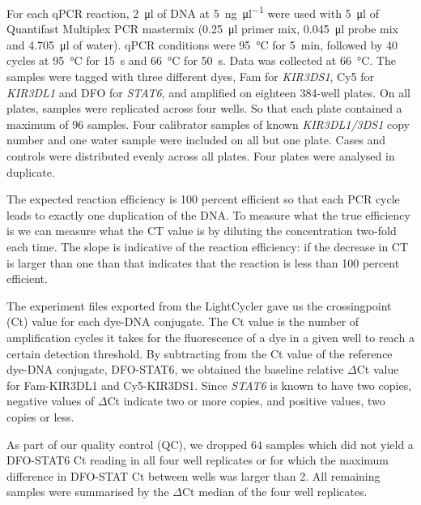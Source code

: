 For each qPCR reaction, \SI{2}{\micro\litre} of DNA at
\SI{5}{\nano\gram\per\micro\litre} were used with \SI{5}{\micro\litre} of
Quantifast Multiplex PCR mastermix (\SI{0.25}{\micro\litre} primer mix,
\SI{0.045}{\micro\litre} probe mix and \SI{4.705}{\micro\litre} of water).
qPCR conditions were \SI{95}{\degreeCelsius} for \SI{5}{\minute}, followed by 40
cycles at \SI{95}{\degreeCelsius} for \SI{15}{\second} and
\SI{66}{\degreeCelsius} for \SI{50}{\second}.  Data was collected at
\SI{66}{\degreeCelsius}.  The samples were tagged with three different dyes,
Fam for \emph{KIR3DS1}, Cy5 for \emph{KIR3DL1} and DFO for \emph{STAT6}, and
amplified on eighteen 384-well plates.  On all plates, samples were replicated
across four wells.  So that each plate contained a maximum of 96 samples.  Four
calibrator samples of known \emph{KIR3DL1/3DS1} copy number and one water
sample were included on all but one plate.  Cases and controls were distributed
evenly across all plates.  Four plates were analysed in duplicate.

The expected reaction efficiency is 100 percent efficient so that each PCR cycle leads to exactly one duplication of the DNA.
To measure what the true efficiency is we can measure what the CT value is by diluting the concentration two-fold each time.
The slope is indicative of the reaction efficiency: 
if the decrease in CT is larger than one than that indicates that the reaction is less than 100 percent efficient.





The experiment files exported from the LightCycler gave us the crossingpoint (Ct) value for each dye-DNA conjugate.
The Ct value is the number of amplification cycles it takes for the fluorescence of a dye in a given well to reach a certain detection threshold.
By subtracting from the Ct value of the reference dye-DNA conjugate, DFO-STAT6, we obtained the baseline relative $\Delta$Ct value for Fam-KIR3DL1 and Cy5-KIR3DS1.  
Since \emph{STAT6} is known to have two copies, negative values of $\Delta$Ct indicate two or more copies, and positive values, two copies or less.

As part of our quality control (QC), we dropped $64$ samples which did not yield a DFO-STAT6 Ct reading in all four well replicates
or for which the maximum difference in DFO-STAT Ct between wells was larger than 2.
All remaining samples were summarised by the $\Delta$Ct median of the four well replicates.


